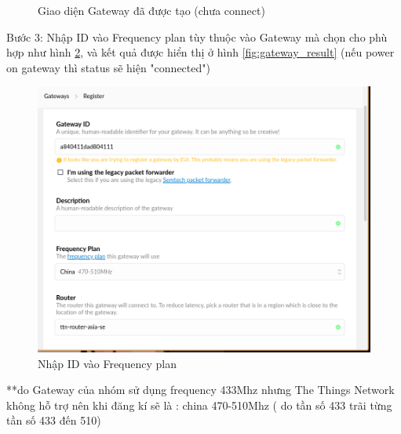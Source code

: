 \begin{description}
\begin{figure}[H]
        \caption{Giao diện Gateway đã được tạo (chưa connect)}
        \label{fig:gateway_console}
    \end{figure}
    \item Bước 3: Nhập ID vào Frequency plan tùy thuộc vào Gateway mà chọn cho phù hợp như hình \ref{fig:choose_gateway}, và kết quả được hiển thị ở hình \ref{fig:gateway_result} (nếu power on gateway thì status sẽ hiện "connected")
    \begin{figure}[H]
        \centering
        \includegraphics[width=\textwidth]{images/Quanh/Gateway_choose.png}
        \caption{Nhập ID vào Frequency plan}
        \label{fig:choose_gateway}
    \end{figure}
\end{description}
**do Gateway của nhóm sử dụng frequency 433Mhz nhưng The Things Network không hỗ trợ nên khi đăng kí sẽ là : china 470-510Mhz ( do tần số 433 trãi từng tần số 433 đến 510)


